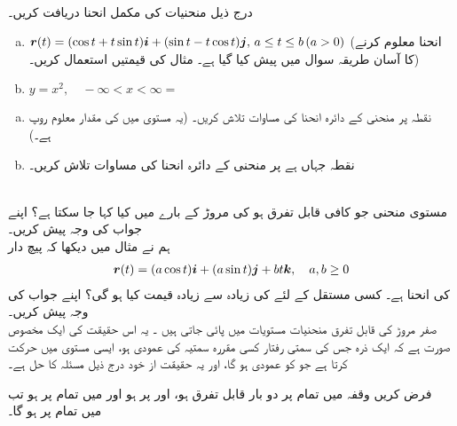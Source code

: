 \\
درج ذیل  منحنیات کی مکمل انحنا دریافت کریں۔
\begin{enumerate}[a.]
\item
${{\boldsymbol{r}}}(t)=(\cos t+t\sin t){\boldsymbol{i}}+(\sin t-t\cos t){\boldsymbol{j}},\, a\le t\le b\, (a>0)$
(انحنا معلوم کرنے کا آسان طریقہ سوال  میں پیش کیا گیا ہے۔ مثال  کی قیمتیں استعمال کریں۔)
\item
$y=x^2,\quad -\infty<x<\infty=$
\end{enumerate}
\begin{enumerate}[a.]
\item
نقطہ  پر منحنی  کے دائرہ انحنا کی مساوات  تلاش کریں۔ (یہ مستوی  میں  کی مقدار معلوم روپ ہے۔)
\item
نقطہ  جہاں  ہے پر منحنی   کے دائرہ انحنا کی مساوات تلاش کریں۔
\end{enumerate}

\\
مستوی منحنی  جو کافی قابل تفرق ہو کی مروڑ کے بارے میں کیا کہا جا سکتا ہے؟ اپنے جواب کی وجہ پیش کریں۔
\\
ہم نے مثال  میں دیکھا کہ  پیچ دار 
\begin{align*}
{\ensuremath{{\boldsymbol{r}}}}(t)=(a\cos t){\boldsymbol{i}}+(a\sin t){\boldsymbol{j}}+bt{\boldsymbol{k}},\quad a,b\ge 0
\end{align*}
کی انحنا   ہے۔ کسی مستقل  کے لئے  کی زیادہ سے زیادہ قیمت کیا ہو گی؟ اپنے جواب کی وجہ پیش کریں۔
\\
صفر مروڑ کی قابل تفرق منحنیات مستویات میں پائی جاتی ہیں ۔ یہ  اس حقیقت کی ایک مخصوص صورت ہے کہ ایک ذرہ جس کی سمتی رفتار کسی مقررہ  سمتیہ  کی  عمودی ہو، ایسی مستوی میں حرکت کرتا ہے جو  کو عمودی ہو گا، اور    یہ حقیقت  از خود درج ذیل مسئلہ کا حل ہے۔

فرض کریں وقفہ  میں تمام  پر    دو بار قابل تفرق ہو، اور  پر  ہو اور  میں  تمام  پر   ہو تب  میں تمام  پر  ہو گا۔


